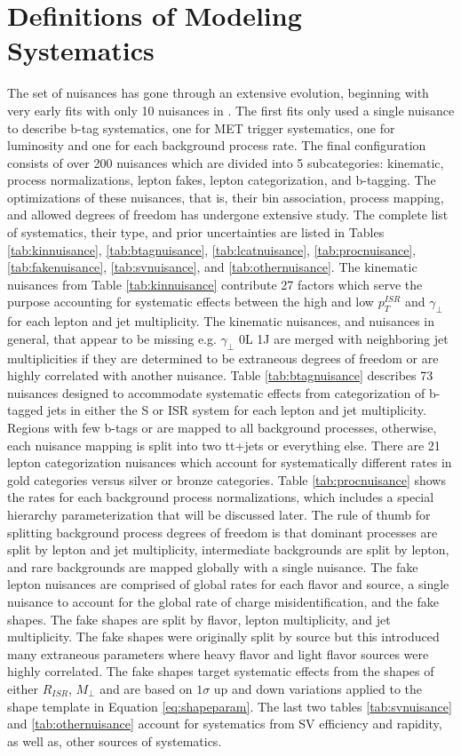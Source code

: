 \section{Definitions of Modeling Systematics}
The set of nuisances has gone through an extensive evolution, beginning with very early fits with only 10 nuisances in \cite{erich}. The first fits only used a single nuisance to describe b-tag systematics, one for MET trigger systematics, one for luminosity and one for each background process rate. The final configuration consists of over 200 nuisances which are divided into 5 subcategories: kinematic, process normalizations, lepton fakes, lepton categorization, and b-tagging. The optimizations of these nuisances, that is, their bin association, process mapping, and  allowed degrees of freedom has undergone extensive study. The complete list of systematics, their type, and prior uncertainties are listed in Tables \ref{tab:kinnuisance}, \ref{tab:btagnuisance}, \ref{tab:lcatnuisance}, \ref{tab:procnuisance}, \ref{tab:fakenuisance}, \ref{tab:svnuisance}, and \ref{tab:othernuisance}.  The kinematic nuisances from Table \ref{tab:kinnuisance} contribute 27 factors which serve the purpose accounting for systematic effects between the high and low $p_T^{ISR}$ and $\gamma_\perp$ for each lepton and jet multiplicity. The kinematic nuisances, and nuisances in general, that appear to be missing e.g. $\gamma_\perp$ 0L 1J are merged with neighboring jet multiplicities if they are determined to be extraneous degrees of freedom or are highly correlated with another nuisance. Table \ref{tab:btagnuisance} describes 73 nuisances designed to accommodate systematic effects from categorization of b-tagged jets in either the S or ISR system for each lepton and jet multiplicity. Regions with few b-tags or are mapped to all background processes, otherwise, each nuisance mapping is split into two tt+jets or everything else. There are 21 lepton categorization nuisances which account for systematically different rates in gold categories versus silver or bronze categories. Table \ref{tab:procnuisance} shows the rates for each background process normalizations, which includes a special hierarchy parameterization that will be discussed later. The rule of thumb for splitting background process degrees of freedom is that dominant processes are split by lepton and jet multiplicity, intermediate backgrounds are split by lepton, and rare backgrounds are mapped globally with a single nuisance. The fake lepton nuisances are comprised of global rates for each flavor and source, a single nuisance to account for the global rate of  charge misidentification, and the fake shapes. The fake shapes are split by flavor, lepton multiplicity, and jet multiplicity. The fake shapes were originally split by source but this introduced many extraneous parameters where heavy flavor and light flavor sources were highly correlated. The fake shapes target systematic effects from the shapes of either $R_{ISR}$, $M_\perp$ and are based on $1\sigma$ up and down variations applied to the shape template in Equation \ref{eq:shapeparam}. The last two tables \ref{tab:svnuisance} and \ref{tab:othernuisance} account for systematics from SV efficiency and rapidity, as well as, other sources of systematics.

